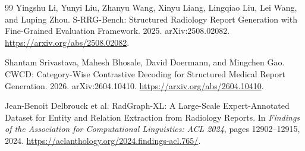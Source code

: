 \documentclass[11pt]{article}
\begin{document}
\begin{thebibliography}{99}
Yingshu Li, Yunyi Liu, Zhanyu Wang, Xinyu Liang, Lingqiao Liu, Lei Wang, and Luping Zhou. S-RRG-Bench: Structured Radiology Report Generation with Fine-Grained Evaluation Framework. 2025. arXiv:2508.02082. \url{https://arxiv.org/abs/2508.02082}.

Shantam Srivastava, Mahesh Bhosale, David Doermann, and Mingchen Gao. CWCD: Category-Wise Contrastive Decoding for Structured Medical Report Generation. 2026. arXiv:2604.10410. \url{https://arxiv.org/abs/2604.10410}.

Jean-Benoit Delbrouck et al. RadGraph-XL: A Large-Scale Expert-Annotated Dataset for Entity and Relation Extraction from Radiology Reports. In \emph{Findings of the Association for Computational Linguistics: ACL 2024}, pages 12902--12915, 2024. \url{https://aclanthology.org/2024.findings-acl.765/}.

\end{thebibliography}
\end{document}
